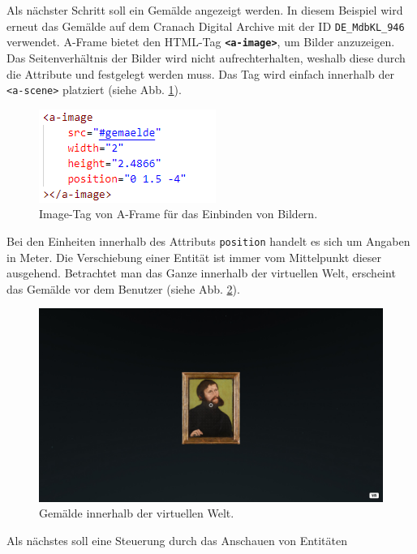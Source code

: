 \documentclass[a4paper,12pt,oneside]{article}
\begin{document}
        Als nächster Schritt soll ein Gemälde angezeigt werden. In diesem
        Beispiel wird erneut das Gemälde auf dem Cranach Digital Archive
        mit der ID \texttt{DE\_MdbKL\_946} verwendet. A-Frame bietet 
        den HTML-Tag \texttt{\textbf{<a-image>}}, um Bilder anzuzeigen.
        Das Seitenverhältnis der Bilder wird nicht aufrechterhalten, weshalb
        diese durch die Attribute  und  
        festgelegt werden muss. Das Tag wird einfach innerhalb der
        \texttt{<a-scene>} platziert (siehe Abb. \ref{fig:a-image1}).        
        \begin{figure}[h]
          \centering
          \includegraphics{img/coding/a-image1.png}
          \caption{Image-Tag von A-Frame für das Einbinden von Bildern.}
          \label{fig:a-image1}
        \end{figure}
        Bei den Einheiten innerhalb des Attributs \texttt{position} handelt
        es sich um Angaben in Meter. Die Verschiebung einer Entität ist immer 
        vom Mittelpunkt dieser ausgehend. Betrachtet man das Ganze innerhalb der
        virtuellen Welt, erscheint das Gemälde vor dem Benutzer
        (siehe Abb. \ref{fig:vr-welt2}).
        \begin{figure}[h]
          \centering
          \includegraphics[scale=0.3]{img/coding/vr-welt2.png}
          \caption{Gemälde innerhalb der virtuellen Welt.}
          \label{fig:vr-welt2}
        \end{figure}
        Als nächstes soll eine Steuerung durch das Anschauen von Entitäten
\end{document}
